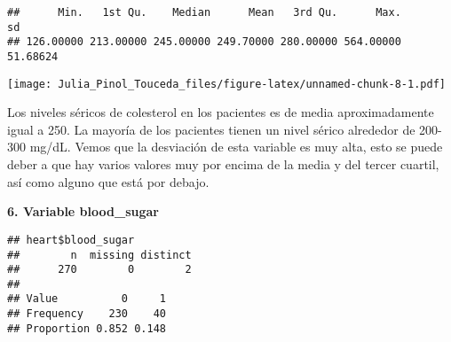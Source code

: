 \documentclass[]{article}
\newenvironment{Shaded}{\begin{snugshade}}{\end{snugshade}}
\newcommand{\KeywordTok}[1]{\textcolor[rgb]{0.13,0.29,0.53}{\textbf{#1}}}
\newcommand{\DataTypeTok}[1]{\textcolor[rgb]{0.13,0.29,0.53}{#1}}
\newcommand{\DecValTok}[1]{\textcolor[rgb]{0.00,0.00,0.81}{#1}}
\newcommand{\StringTok}[1]{\textcolor[rgb]{0.31,0.60,0.02}{#1}}
\newcommand{\OperatorTok}[1]{\textcolor[rgb]{0.81,0.36,0.00}{\textbf{#1}}}
\newcommand{\NormalTok}[1]{#1}
\begin{document}
\begin{verbatim}
##      Min.   1st Qu.    Median      Mean   3rd Qu.      Max.        sd 
## 126.00000 213.00000 245.00000 249.70000 280.00000 564.00000  51.68624
\end{verbatim}

\begin{Shaded}
\end{Shaded}

\texttt{[image: Julia\_Pinol\_Touceda\_files/figure-latex/unnamed-chunk-8-1.pdf]}

Los niveles séricos de colesterol en los pacientes es de media
aproximadamente igual a 250. La mayoría de los pacientes tienen un nivel
sérico alrededor de 200-300 mg/dL. Vemos que la desviación de esta
variable es muy alta, esto se puede deber a que hay varios valores muy
por encima de la media y del tercer cuartil, así como alguno que está
por debajo.

\textbf{6. Variable blood\_sugar}

\begin{Shaded}
\end{Shaded}

\begin{verbatim}
## heart$blood_sugar 
##        n  missing distinct 
##      270        0        2 
##                       
## Value          0     1
## Frequency    230    40
## Proportion 0.852 0.148
\end{verbatim}
\end{document}
